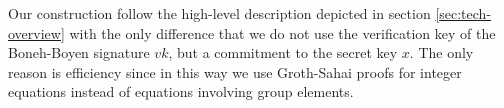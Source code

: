 

%
%
%


%
Our construction follow the high-level description depicted in section \ref{sec:tech-overview} with the only difference that we do not use the verification key of the Boneh-Boyen signature $vk$, but a commitment to the secret key $x$. The only reason is efficiency since in this way we use Groth-Sahai proofs for integer equations instead of equations involving group elements. 


